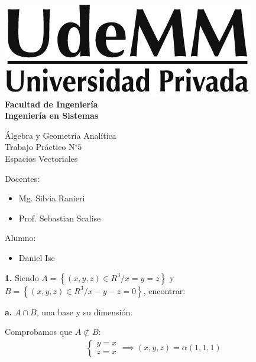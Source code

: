 \documentclass[12pt]{article}
\begin{document}
\thispagestyle{empty}

\begin{center}
  \vspace*{.5cm}
  \includegraphics[scale=0.4]{../../img/udemm-logo.png}\\
  \vspace{.2cm}
  \Large
  \textbf{Facultad de Ingeniería}\\
  \textbf{Ingeniería en Sistemas}\\
  \vspace{2cm}

  \Huge
  Álgebra y Geometría Analítica\\
  Trabajo Práctico N\(^{\circ} 5\) \\
  Espacios Vectoriales
  \vfill

  \raggedright
  \Large
  Docentes:
  \begin{itemize}
    \item[] Mg. Silvia Ranieri\\
    \item[] Prof. Sebastian Scalise\\
  \end{itemize}
  Alumno:
  \begin{itemize}
    \item[] Daniel Ise
  \end{itemize}
  \vspace{1cm}

\end{center}

\pagebreak

\textbf{1.}
Siendo \(A = \left\{(x,y,z) \in R^{3} / x = y = z\right\}\) y
\(B = \left\{(x,y,z) \in R^{3} / x-y-z=0\right\}\),
encontrar:

\hspace{6mm}\textbf{a.}
\(A \cap B\), una base y su dimensión.

Comprobamos que \(A \not \subset B\):
\begin{align*}
  \begin{cases}
    y = x \\
    z = x
  \end{cases} \implies (x,y,z) = \alpha (1,1,1)
\end{align*}
\end{document}
